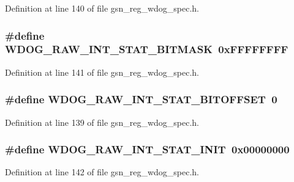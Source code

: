 Definition at line 140 of file gsn\_\-reg\_\-wdog\_\-spec.h.

\hypertarget{a00577_a481dc812a5a4ca84f37bb53b048919b8}{
\subsubsection[{WDOG\_\-RAW\_\-INT\_\-STAT\_\-BITMASK}]{\setlength{\rightskip}{0pt plus 5cm}\#define WDOG\_\-RAW\_\-INT\_\-STAT\_\-BITMASK~0xFFFFFFFF}}
\label{a00577_a481dc812a5a4ca84f37bb53b048919b8}


Definition at line 141 of file gsn\_\-reg\_\-wdog\_\-spec.h.

\hypertarget{a00577_a69ac4ca2c2b71eec916b616351c6157f}{
\subsubsection[{WDOG\_\-RAW\_\-INT\_\-STAT\_\-BITOFFSET}]{\setlength{\rightskip}{0pt plus 5cm}\#define WDOG\_\-RAW\_\-INT\_\-STAT\_\-BITOFFSET~0}}
\label{a00577_a69ac4ca2c2b71eec916b616351c6157f}


Definition at line 139 of file gsn\_\-reg\_\-wdog\_\-spec.h.

\hypertarget{a00577_a66f95510b1241c157b16a07497dc6ddf}{
\subsubsection[{WDOG\_\-RAW\_\-INT\_\-STAT\_\-INIT}]{\setlength{\rightskip}{0pt plus 5cm}\#define WDOG\_\-RAW\_\-INT\_\-STAT\_\-INIT~0x00000000}}
\label{a00577_a66f95510b1241c157b16a07497dc6ddf}


Definition at line 142 of file gsn\_\-reg\_\-wdog\_\-spec.h.

